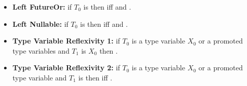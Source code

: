 \documentclass[makeidx]{article}
\begin{document}
\begin{itemize}
\begin{itemize}
    then the query is true if{}f .
  \item
    if $T_1$ is  for some $S$ then the query is true.
  \item
    Otherwise, the query is false.
  \end{itemize}
\item
  \textbf{Left FutureOr:}
  if $T_0$ is 
  then  if{}f
   and .
\item
  \textbf{Left Nullable:}
  if $T_0$ is  then  if{}f
   and .
\item
  \textbf{Type Variable Reflexivity 1:}
  if $T_0$ is a type variable $X_0$
  or a promoted type variables  and $T_1$ is $X_0$
  then .
  
\item
  \textbf{Type Variable Reflexivity 2:}
  if $T_0$ is a type variable $X_0$
  or a promoted type variable 
  and $T_1$ is 
  then  if{}f .


\end{itemize}
\end{document}
